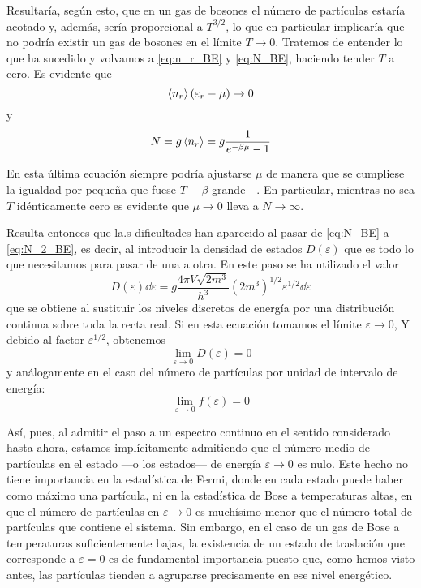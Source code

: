 Resultaría, según esto, que en un gas de bosones el número de partículas estaría acotado y, además, sería proporcional a $T^{3/2}$, lo que en particular implicaría que no podría existir un gas de bosones en el límite $T \rightarrow 0$.
Tratemos de entender lo que ha sucedido y volvamos a \eqref{eq:n_r_BE} y \eqref{eq:N_BE}, haciendo tender $T$ a cero. Es evidente que
$$\expval{n_r}(\varepsilon_r - \mu) \rightarrow 0$$
y
$$N = g\expval{n_r} = g \frac{1}{e^{-\beta\mu} - 1}$$

En esta última ecuación siempre podría ajustarse $\mu$ de manera que se cumpliese la igualdad por pequeña que fuese $T$ ---$\beta$ grande---.
En particular, mientras no sea $T$ idénticamente cero es evidente que $\mu \rightarrow 0$ lleva a $N \rightarrow \infty$.

Resulta entonces que la.s dificultades han aparecido al pasar de \eqref{eq:N_BE} a \eqref{eq:N_2_BE}, es decir, al introducir la densidad de estados $D(\varepsilon)$ que es todo lo que necesitamos para pasar de una a otra.
En este paso se ha utilizado el valor
\begin{equation}\label{eq:D_vareps_BE}
	D(\varepsilon) \dd{\varepsilon} = g \frac{4\pi V\sqrt{2m^3}}{h^3} (2m^3)^{1/2} \varepsilon^{1/2} \dd{\varepsilon}
\end{equation}
que se obtiene al sustituir los niveles discretos de energía por una distribución continua sobre toda la recta real.
Si en esta ecuación tomamos el límite $\varepsilon \rightarrow 0$, Y debido al factor $\varepsilon^{1/2}$, obtenemos
$$\lim\limits_{\varepsilon \rightarrow 0} D(\varepsilon) = 0$$
y análogamente en el caso del número de partículas por unidad de intervalo de energía:
$$\lim\limits_{\varepsilon \rightarrow 0} f(\varepsilon) = 0$$

Así, pues, al admitir el paso a un espectro continuo en el sentido considerado hasta ahora, estamos implícitamente admitiendo que el número medio de partículas en el estado ---o los estados--- de energía $\varepsilon \rightarrow 0$ es nulo.
Este hecho no tiene importancia en la estadística de Fermi, donde en cada estado puede haber como máximo una partícula, ni en la estadística de Bose a temperaturas altas, en que el número de partículas en $\varepsilon \rightarrow 0$ es muchísimo menor que el número total de partículas que contiene el sistema.
Sin embargo, en el caso de un gas de Bose a temperaturas suficientemente bajas, la existencia de un estado de traslación que corresponde a $\varepsilon = 0$ es de fundamental importancia puesto que, como hemos visto antes, las partículas tienden a agruparse precisamente en ese nivel energético.

